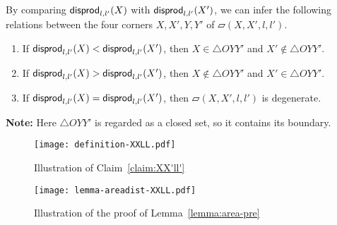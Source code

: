 \documentclass{ws-ijcga}
\begin{document}
\begin{lemma}\label{lemma:area-pre}
By comparing $\mathsf{disprod}_{l,l'}(X)$ with $\mathsf{disprod}_{l,l'}(X')$, we can infer the following relations between the four corners $X,X',Y,Y'$ of $\parallelogram(X,X',l,l')$.
\begin{enumerate}
  \item If $\mathsf{disprod}_{l,l'}(X)<\mathsf{disprod}_{l,l'}(X')$, then $X\in \triangle OYY'$ and $X'\notin \triangle OYY'$.
  \item If $\mathsf{disprod}_{l,l'}(X)>\mathsf{disprod}_{l,l'}(X')$, then $X\notin \triangle OYY'$ and $X'\in \triangle OYY'$.
  \item If $\mathsf{disprod}_{l,l'}(X)=\mathsf{disprod}_{l,l'}(X')$, then $\parallelogram(X,X',l,l')$ is degenerate.
\end{enumerate}
\textbf{Note:} Here $\triangle OYY'$ is regarded as a closed set, so it contains its boundary.\smallskip
\end{lemma}

\begin{figure}[h]
\begin{minipage}{0.26\textwidth}
\centering\texttt{[image: definition-XXLL.pdf]}
\caption{Illustration of Claim~\ref{claim:XX'll'}}\label{fig:def-XXLL}
\end{minipage}
\begin{minipage}{0.73\textwidth}
\centering\texttt{[image: lemma-areadist-XXLL.pdf]}
\caption{Illustration of the proof of Lemma~\ref{lemma:area-pre}}\label{fig:area-pre}
\end{minipage}
\end{figure}
\end{document}

